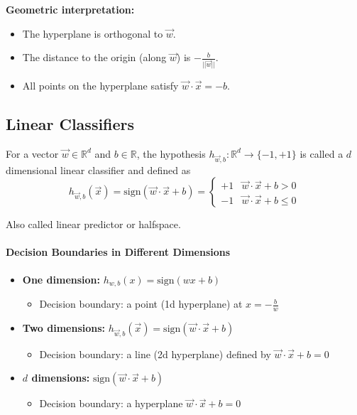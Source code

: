 \textbf{Geometric interpretation:}
\begin{itemize}
    \item The hyperplane is orthogonal to $\vec{w}$.
    \item The distance to the origin (along $\vec{w}$) is $-\frac{b}{||\vec{w}||}$.
    \item All points on the hyperplane satisfy $\vec{w} \cdot \vec{x} = -b$.
\end{itemize}

\subsection{Linear Classifiers}

For a vector $\vec{w} \in \mathbb{R}^d$ and $b \in \mathbb{R}$, the hypothesis $h_{\vec{w},b} : \mathbb{R}^d \rightarrow \{-1, +1\}$ is called a $d$ dimensional linear classifier and defined as
\[
h_{\vec{w},b}(\vec{x}) = \mathrm{sign}(\vec{w} \cdot \vec{x} + b) =
\begin{cases}
+1 & \vec{w} \cdot \vec{x} + b > 0 \\
-1 & \vec{w} \cdot \vec{x} + b \leq 0
\end{cases}
\]

Also called linear predictor or halfspace.

\paragraph{Decision Boundaries in Different Dimensions}
\begin{itemize}
    \item \textbf{One dimension:} $h_{w,b}(x) = \mathrm{sign}(wx + b)$
    \begin{itemize}
        \item Decision boundary: a point (1d hyperplane) at $x = -\frac{b}{w}$
    \end{itemize}
    \item \textbf{Two dimensions:} $h_{\vec{w},b}(\vec{x}) = \mathrm{sign}(\vec{w} \cdot \vec{x} + b)$
    \begin{itemize}
        \item Decision boundary: a line (2d hyperplane) defined by $\vec{w} \cdot \vec{x} + b = 0$
    \end{itemize}
    \item \textbf{$d$ dimensions:} $\mathrm{sign}(\vec{w} \cdot \vec{x} + b)$
    \begin{itemize}
        \item Decision boundary: a hyperplane $\vec{w} \cdot \vec{x} + b = 0$
    \end{itemize}
\end{itemize}

